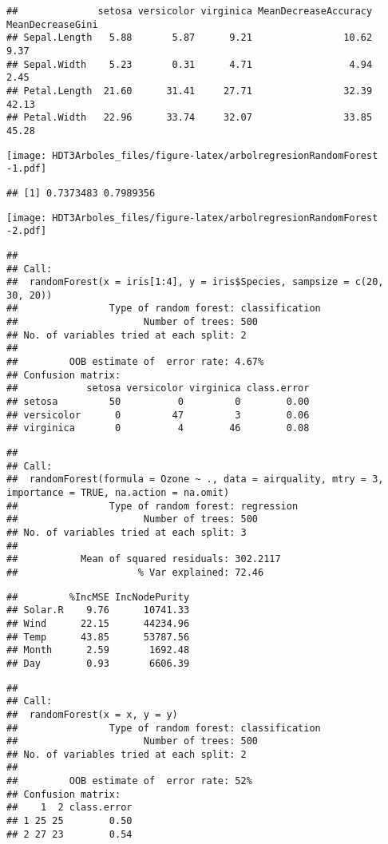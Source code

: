 \documentclass[
]{article}
\begin{document}
\begin{verbatim}
##              setosa versicolor virginica MeanDecreaseAccuracy MeanDecreaseGini
## Sepal.Length   5.88       5.87      9.21                10.62             9.37
## Sepal.Width    5.23       0.31      4.71                 4.94             2.45
## Petal.Length  21.60      31.41     27.71                32.39            42.13
## Petal.Width   22.96      33.74     32.07                33.85            45.28
\end{verbatim}

\texttt{[image: HDT3Arboles\_files/figure-latex/arbolregresionRandomForest -1.pdf]}

\begin{verbatim}
## [1] 0.7373483 0.7989356
\end{verbatim}

\texttt{[image: HDT3Arboles\_files/figure-latex/arbolregresionRandomForest -2.pdf]}

\begin{verbatim}
## 
## Call:
##  randomForest(x = iris[1:4], y = iris$Species, sampsize = c(20,      30, 20)) 
##                Type of random forest: classification
##                      Number of trees: 500
## No. of variables tried at each split: 2
## 
##         OOB estimate of  error rate: 4.67%
## Confusion matrix:
##            setosa versicolor virginica class.error
## setosa         50          0         0        0.00
## versicolor      0         47         3        0.06
## virginica       0          4        46        0.08
\end{verbatim}

\begin{verbatim}
## 
## Call:
##  randomForest(formula = Ozone ~ ., data = airquality, mtry = 3,      importance = TRUE, na.action = na.omit) 
##                Type of random forest: regression
##                      Number of trees: 500
## No. of variables tried at each split: 3
## 
##           Mean of squared residuals: 302.2117
##                     % Var explained: 72.46
\end{verbatim}

\begin{verbatim}
##         %IncMSE IncNodePurity
## Solar.R    9.76      10741.33
## Wind      22.15      44234.96
## Temp      43.85      53787.56
## Month      2.59       1692.48
## Day        0.93       6606.39
\end{verbatim}

\begin{verbatim}
## 
## Call:
##  randomForest(x = x, y = y) 
##                Type of random forest: classification
##                      Number of trees: 500
## No. of variables tried at each split: 2
## 
##         OOB estimate of  error rate: 52%
## Confusion matrix:
##    1  2 class.error
## 1 25 25        0.50
## 2 27 23        0.54
\end{verbatim}
\end{document}
